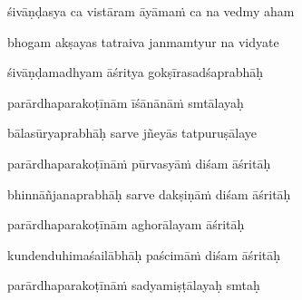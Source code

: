 śivāṇḍasya ca vistāram āyāmaṁ ca na vedmy aham\thinspace{\dandab} \dontdisplaylinenum

bhogam akṣayas tatraiva janmamtyur na vidyate \veg\dontdisplaylinenum
{}

śivāṇḍamadhyam āśritya gokṣīrasadśaprabhāḥ\thinspace{\dandab} \dontdisplaylinenum

parārdhaparakoṭīnām īśānānāṁ smtālayaḥ \veg\dontdisplaylinenum
{}

bālasūryaprabhāḥ sarve jñeyās tatpuruṣālaye\thinspace{\dandab} \dontdisplaylinenum

parārdhaparakoṭīnāṁ pūrvasyāṁ diśam āśritāḥ \veg\dontdisplaylinenum
{}

bhinnāñjanaprabhāḥ sarve dakṣiṇāṁ diśam āśritāḥ\thinspace{\dandab} \dontdisplaylinenum

parārdhaparakoṭīnām aghorālayam āśritāḥ \veg\dontdisplaylinenum
{}

kundenduhimaśailābhāḥ paścimāṁ diśam āśritāḥ\thinspace{\dandab} \dontdisplaylinenum

parārdhaparakoṭīnāṁ sadyamiṣṭālayaḥ smtaḥ \veg\dontdisplaylinenum
{}

